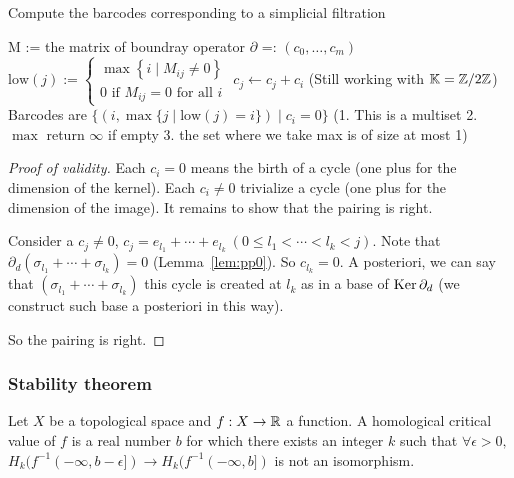 \begin{algorithm}
  \caption{Compute the barcodes corresponding to a simplicial filtration}
  \begin{algorithmic}
  \State M := the matrix of boundray operator $\partial$ =: $(c_0, \ldots, c_m)$
  \State $\mathrm{low}(j):=\left\{\begin{array}{l}\max \left\{i \mid M_{i j} \neq 0\right\} \\ 0 \text { if } M_{i j}=0 \text { for all } i\end{array}\right.$
  \State $c_j \gets c_j+c_i$ (Still working with $\mathbb{K} = \mathbb{Z}/2\mathbb{Z}$)
  \EndWhile
  \EndFor
  \State Barcodes are $\{(i, \max\{j \mid \mathrm{low}(j)=i\}) \mid c_i = 0\}$
  (1. This is a multiset 2. $\max$ return $\infty$ if empty 3. the set where we take max is of size at most 1)
  \end{algorithmic}
\end{algorithm}

\begin{proof}[Proof of validity]
Each $c_i = 0$ means the birth of a cycle (one plus for the dimension of the kernel).
Each $c_i \not= 0$ trivialize a cycle (one plus for the dimension of the image).
It remains to show that the pairing is right.

Consider a $c_j \not= 0$, $c_j = e_{l_1} + \cdots + e_{l_k}~(0\le l_1 < \cdots < l_k < j)$.
Note that $\partial_d (\sigma_{l_1} + \cdots + \sigma_{l_k}) = 0$ (Lemma~\ref{lem:pp0}).
So $c_{l_k} = 0$. A posteriori, we can say that $(\sigma_{l_1} + \cdots + \sigma_{l_k})$
this cycle is created at $l_k$ as in a base of $\operatorname{Ker} \partial_d$ (we construct
such base a posteriori in this way).

So the pairing is right.

\end{proof}

\subsubsection{Stability theorem}

\newcommand{\Dg}{\mathrm{Dg}}

\begin{definition}
  Let $X$ be a topological space and $f : X \to \mathbb{R}$ a function.
  A homological critical value of $f$ is a real number $b$ for which
  there exists an integer $k$ such that $\forall \epsilon > 0, $
  $H_k(f^{-1}(-\infty, b-\epsilon]) \to H_k(f^{-1}(-\infty, b])$ is not
  an isomorphism.
\end{definition}


